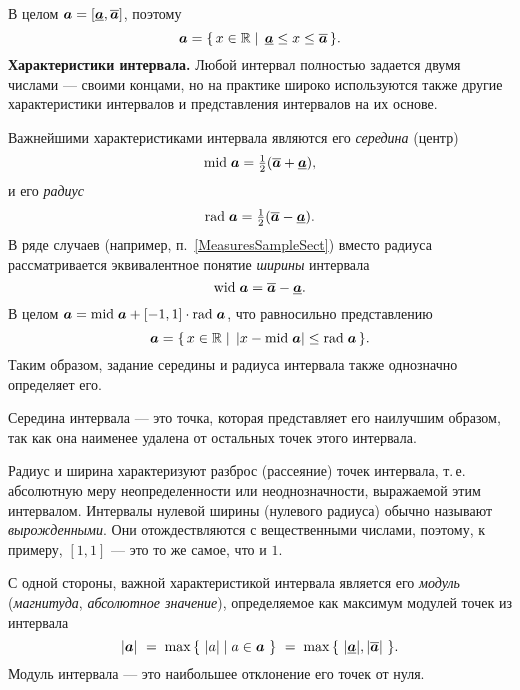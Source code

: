 \documentclass[a5paper,openany]{book}
\newcommand{\mbf}[1]{\protect\text{\boldmath$#1$}}
\newcommand{\mbb}{\mathbb}
\newcommand{\ov}{\overline}
\newcommand{\un}{\underline}
\newcommand{\m}{\mathrm{mid}\;}
\newcommand{\w}{\mathrm{wid}\;}
\renewcommand{\r}{\mathrm{rad}\;}
\begin{document}
{{В целом $\mbf{a} = [\un{\mbf{a}}, \ov{\mbf{a}}]$, поэтому
\begin{equation}
	\label{LowUpRepres}
	\mbf{a} = \{\,x\in\mbb{R} \mid \,\un{\mbf{a}}\leq x\leq \ov{\mbf{a}}\,\}.
\end{equation} 
{\bf Характеристики интервала.} \label{InrevalProp}
Любой интервал полностью задается двумя числами --- своими концами, но на практике 
широко используются также другие характеристики интервалов и представления интервалов 
на их основе. 

Важнейшими характеристиками интервала являются его \emph{середина} (центр) 
\begin{equation}\label{midint}
	\textstyle\index{середина интервала} 
	\m\mbf{a} = \frac{1}{2}(\ov{\mbf{a}} + \un{\mbf{a}}),
\end{equation}
и его \emph{радиус} 
\begin{equation}\label{radint} 	\textstyle\index{радиус интервала}
	\r\mbf{a} = \frac{1}{2}(\ov{\mbf{a}} - \un{\mbf{a}}).
\end{equation} 
В ряде случаев (например, п.~\ref{MeasuresSampleSect}) вместо радиуса рассматривается эквивалентное понятие \emph{ширины} 
интервала   
\begin{equation}\label{widint}
	\w\mbf{a} = \ov{\mbf{a}} - \un{\mbf{a}}. 
\end{equation}
В целом $\mbf{a} = \m\mbf{a} + [-1, 1]\cdot\r\mbf{a}$, что равносильно представлению 
\begin{equation}
	\label{MidRadRepres}
	\mbf{a} = \{\,x\in\mbb{R} \mid \,|x-\m\mbf{a}|\leq \r\mbf{a}\,\}.
\end{equation} 
Таким образом, задание середины и радиуса интервала также однозначно определяет его.

Середина интервала --- это точка, которая представляет его наилучшим образом, 
так как она наименее удалена от остальных точек этого интервала. 

Радиус и ширина характеризуют разброс (рассеяние) точек интервала, т.\,е. абсолютную 
меру неопределенности или неоднозначности, выражаемой этим интервалом. 
Интервалы нулевой ширины (нулевого радиуса) обычно называют  
\textit{вырожденными}. Они отождествляются с вещественными числами, поэтому, 
к примеру, $[1, 1]$ --- это то же самое, что и $1$. %

С одной стороны, важной характеристикой интервала является его \textit{модуль} (\emph{магнитуда}, \textit{абсолютное 	значение}),  определяемое как максимум модулей точек из интервала 
\begin{equation*} 
	\index{магнитуда}\index{модуль интервала}  
	|\mbf{a}|\  = \;\max\,\{ \ |a| \mid a\in\mbf{a} \ \} \ 
	= \;\max\,\{ \ |\un{\mbf{a}}|, |\ov{\mbf{a}}| \ \}.  
\end{equation*} 
Модуль интервала --- это наибольшее отклонение его точек от нуля. 

}}
\end{document}
